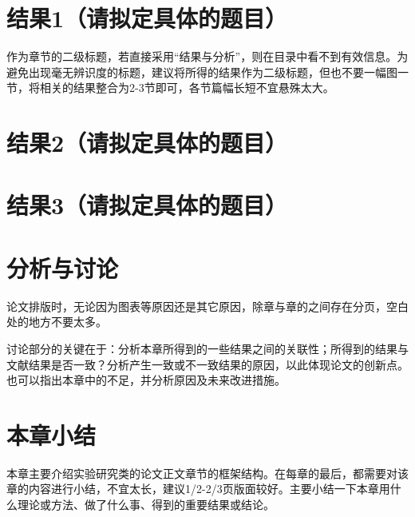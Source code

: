 \section{结果1（请拟定具体的题目）}
作为章节的二级标题，若直接采用“结果与分析”，则在目录中看不到有效信息。为避免出现毫无辨识度的标题，建议将所得的结果作为二级标题，但也不要一幅图一节，将相关的结果整合为2-3节即可，各节篇幅长短不宜悬殊太大。

\section{结果2（请拟定具体的题目）}

\section{结果3（请拟定具体的题目）}

\section{分析与讨论}
论文排版时，无论因为图表等原因还是其它原因，除章与章的之间存在分页，空白处的地方不要太多。

讨论部分的关键在于：分析本章所得到的一些结果之间的关联性；所得到的结果与文献结果是否一致？分析产生一致或不一致结果的原因，以此体现论文的创新点。也可以指出本章中的不足，并分析原因及未来改进措施。

\section{本章小结}
本章主要介绍实验研究类的论文正文章节的框架结构。在每章的最后，都需要对该章的内容进行小结，不宜太长，建议1/2-2/3页版面较好。主要小结一下本章用什么理论或方法、做了什么事、得到的重要结果或结论。
